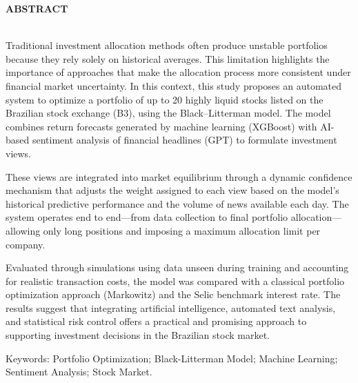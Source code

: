 \begin{center}
\textbf{ABSTRACT}
\end{center}

$\!$\\


Traditional investment allocation methods often produce unstable portfolios because they rely solely on historical averages. This limitation highlights the importance of approaches that make the allocation process more consistent under financial market uncertainty. In this context, this study proposes an automated system to optimize a portfolio of up to 20 highly liquid stocks listed on the Brazilian stock exchange (B3), using the Black–Litterman model. The model combines return forecasts generated by machine learning (XGBoost) with AI-based sentiment analysis of financial headlines (GPT) to formulate investment views.

These views are integrated into market equilibrium through a dynamic confidence mechanism that adjusts the weight assigned to each view based on the model’s historical predictive performance and the volume of news available each day. The system operates end to end—from data collection to final portfolio allocation—allowing only long positions and imposing a maximum allocation limit per company.

Evaluated through simulations using data unseen during training and accounting for realistic transaction costs, the model was compared with a classical portfolio optimization approach (Markowitz) and the Selic benchmark interest rate. The results suggest that integrating artificial intelligence, automated text analysis, and statistical risk control offers a practical and promising approach to supporting investment decisions in the Brazilian stock market.

\vspace{1cm}

\hspace{-1.3cm}Keywords: Portfolio Optimization; Black-Litterman Model; Machine Learning; Sentiment Analysis; Stock Market.



